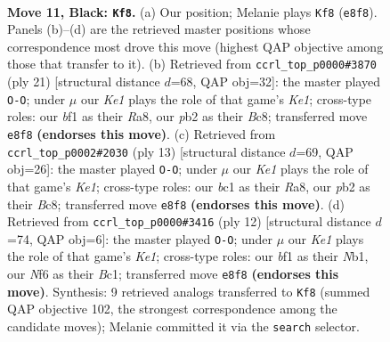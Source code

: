 \documentclass[11pt]{article}
\begin{document}
\clearpage

\begin{figure}[p]\centering
\begin{subfigure}{0.46\textwidth}\centering
\resizebox{\linewidth}{!}{%
\newchessgame
\chessboard[
  setfen={rnbqk1r1/pp2bppp/5n2/3p2N1/3P4/2N5/PP1K1PPP/R1BQ1B1R b - - 5 11},
  showmover=false,
  pgfstyle=straightmove, color=movearrow, markmove={e8-f8}
]}
\caption{}
\end{subfigure}\hfill
\begin{subfigure}{0.46\textwidth}\centering
\resizebox{\linewidth}{!}{%
\newchessgame
\chessboard[
  setfen={r1bqk2r/ppn1bppp/4pn2/4N3/2QP4/P1N5/1P2BPPP/R1B1K2R b KQkq - 4 11},
  showmover=false,
  pgfstyle=straightmove, color=movearrow, markmove={e8-g8}
]}
\caption{}
\end{subfigure}
\\[4pt]
\begin{subfigure}{0.46\textwidth}\centering
\resizebox{\linewidth}{!}{%
\newchessgame
\chessboard[
  setfen={rnbqk2r/ppp1bppp/5n2/3p4/3P4/2N1P3/PP1B1PPP/R2QKBNR b KQkq - 0 7},
  showmover=false,
  pgfstyle=straightmove, color=movearrow, markmove={e8-g8}
]}
\caption{}
\end{subfigure}\hfill
\begin{subfigure}{0.46\textwidth}\centering
\resizebox{\linewidth}{!}{%
\newchessgame
\chessboard[
  setfen={r1bqkb1r/ppp2ppp/2n5/3p4/3Pn3/3B1N2/PPP2PPP/RNBQK2R w KQkq - 2 7},
  showmover=false,
  pgfstyle=straightmove, color=movearrow, markmove={e1-g1}
]}
\caption{}
\end{subfigure}
\caption{\textbf{Move 11, Black: \texttt{Kf8}.} (a) Our position; Melanie plays \texttt{Kf8} (\texttt{e8f8}). Panels (b)--(d) are the retrieved master positions whose correspondence most drove this move (highest QAP objective among those that transfer to it). (b) Retrieved from \texttt{ccrl\_top\_p0000\#3870} (ply 21) [structural distance $d$=68, QAP obj=32]: the master played \texttt{O-O}; under $\mu$ our \emph{Ke1} plays the role of that game's \emph{Ke1}; cross-type roles: our \emph{b}f1 as their \emph{R}a8, our \emph{p}b2 as their \emph{B}c8; transferred move \texttt{e8f8} \textbf{(endorses this move)}. (c) Retrieved from \texttt{ccrl\_top\_p0002\#2030} (ply 13) [structural distance $d$=69, QAP obj=26]: the master played \texttt{O-O}; under $\mu$ our \emph{Ke1} plays the role of that game's \emph{Ke1}; cross-type roles: our \emph{b}c1 as their \emph{R}a8, our \emph{p}b2 as their \emph{B}c8; transferred move \texttt{e8f8} \textbf{(endorses this move)}. (d) Retrieved from \texttt{ccrl\_top\_p0000\#3416} (ply 12) [structural distance $d$=74, QAP obj=6]: the master played \texttt{O-O}; under $\mu$ our \emph{Ke1} plays the role of that game's \emph{Ke1}; cross-type roles: our \emph{b}f1 as their \emph{N}b1, our \emph{N}f6 as their \emph{B}c1; transferred move \texttt{e8f8} \textbf{(endorses this move)}. Synthesis: 9 retrieved analogs transferred to \texttt{Kf8} (summed QAP objective 102, the strongest correspondence among the candidate moves); Melanie committed it via the \texttt{search} selector.}
\label{fig:thought-m21}
\end{figure}
\end{document}

